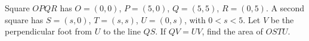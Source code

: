 Square $OPQR$ has $O=(0,0)$, $P=(5,0)$, $Q=(5,5)$, $R=(0,5)$. A second square has $S=(s,0)$, $T=(s,s)$, $U=(0,s)$, with $0<s<5$. Let $V$ be the perpendicular foot from $U$ to the line $QS$. If $QV=UV$, find the area of $OSTU$.
